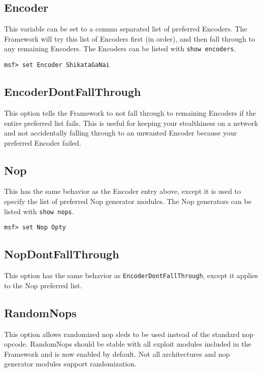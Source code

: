 \documentclass{report}
\begin{document}
	\subsection{Encoder}
\par
This variable can be set to a comma separated list of preferred Encoders. The
Framework will try this list of Encoders first (in order), and then fall through
to any remaining Encoders. The Encoders can be listed with \texttt{show encoders}.  

\begin{verbatim}
msf> set Encoder ShikataGaNai
\end{verbatim}

	\subsection{EncoderDontFallThrough}
\par
This option tells the Framework to not fall through to remaining Encoders if the
entire preferred list fails.  This is useful for keeping your stealthiness on a
network and not accidentally falling through to an unwanted Encoder because
your preferred Encoder failed.  

	\subsection{Nop}
\par
This has the same behavior as the Encoder entry above, except it is used to
specify the list of preferred Nop generator modules. The Nop generators can be
listed with \texttt{show nops}.  

\begin{verbatim}
msf> set Nop Opty
\end{verbatim}

	\subsection{NopDontFallThrough}
\par
This option has the same behavior as \texttt{EncoderDontFallThrough}, except it
applies to the Nop preferred list. 

	\subsection{RandomNops}
\par
This option allows randomized nop sleds to be used instead of the standard nop
opcode. RandomNops should be stable with all exploit modules included in the
Framework and is now enabled by default. Not all architectures and nop generator
modules support randomization.
\end{document}
